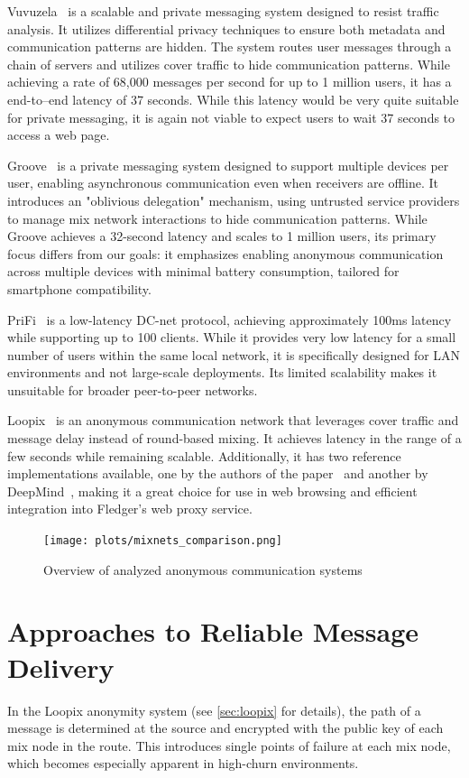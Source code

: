 \documentclass[a4paper,11pt,oneside]{report}
\begin{document}
Vuvuzela~\cite{vuvuzela} is a scalable and private messaging system designed to resist traffic analysis. It utilizes differential privacy techniques to ensure both metadata and communication patterns are hidden. The system routes user messages through a chain of servers and utilizes cover traffic to hide communication patterns. While achieving a rate of 68,000 messages per second for up to 1 million users, it has a end-to--end latency of 37 seconds. While this latency would be very quite suitable for private messaging, it is again not viable to expect users to wait 37 seconds to access a web page.

Groove~\cite{groove} is a private messaging system designed to support multiple devices per user, enabling asynchronous communication even when receivers are offline. It introduces an "oblivious delegation" mechanism, using untrusted service providers to manage mix network interactions to hide communication patterns. While Groove achieves a 32-second latency and scales to 1 million users, its primary focus differs from our goals: it emphasizes enabling anonymous communication across multiple devices with minimal battery consumption, tailored for smartphone compatibility.

PriFi~\cite{prifi} is a low-latency DC-net protocol, achieving approximately 100ms latency while supporting up to 100 clients. While it provides very low latency for a small number of users within the same local network, it is specifically designed for LAN environments and not large-scale deployments. Its limited scalability makes it unsuitable for broader peer-to-peer networks.

Loopix~\cite{loopix} is an anonymous communication network that leverages cover traffic and message delay instead of round-based mixing. It achieves latency in the range of a few seconds while remaining scalable. Additionally, it has two reference implementations available, one by the authors of the paper~\cite{impl_loopix} and another by DeepMind~\cite{loopix_deepmind}, making it a great choice for use in web browsing and efficient integration into Fledger's web proxy service.

\begin{figure}[H]
    \centering
    \texttt{[image: plots/mixnets\_comparison.png]}
    \caption{Overview of analyzed anonymous communication systems}
    \label{fig:comparison}
\end{figure}

\section{Approaches to Reliable Message Delivery}
\label{sec:reliable_message_delivery}
In the Loopix anonymity system (see \autoref{sec:loopix} for details), the path of a message is determined at the source and encrypted with the public key of each mix node in the route. This introduces single points of failure at each mix node, which becomes especially apparent in high-churn environments.
\end{document}
